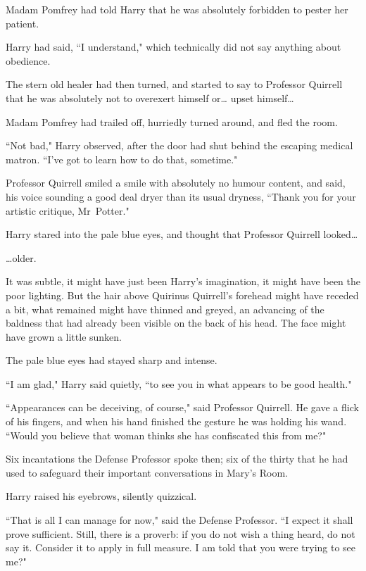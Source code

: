 Madam Pomfrey had told Harry that he was absolutely forbidden to pester her patient.

Harry had said, ``I understand," which technically did not say anything about obedience.

The stern old healer had then turned, and started to say to Professor Quirrell that he was absolutely not to overexert himself or{\ldots} upset himself{\ldots}

Madam Pomfrey had trailed off, hurriedly turned around, and fled the room.

``Not bad," Harry observed, after the door had shut behind the escaping medical matron. ``I've got to learn how to do that, sometime."

Professor Quirrell smiled a smile with absolutely no humour content, and said, his voice sounding a good deal dryer than its usual dryness, ``Thank you for your artistic critique, Mr~Potter."

Harry stared into the pale blue eyes, and thought that Professor Quirrell looked{\ldots}

{\ldots}older.

It was subtle, it might have just been Harry's imagination, it might have been the poor lighting. But the hair above Quirinus Quirrell's forehead might have receded a bit, what remained might have thinned and greyed, an advancing of the baldness that had already been visible on the back of his head. The face might have grown a little sunken.

The pale blue eyes had stayed sharp and intense.

``I am glad," Harry said quietly, ``to see you in what appears to be good health."

``Appearances can be deceiving, of course," said Professor Quirrell. He gave a flick of his fingers, and when his hand finished the gesture he was holding his wand. ``Would you believe that woman thinks she has confiscated this from me?"

Six incantations the Defense Professor spoke then; six of the thirty that he had used to safeguard their important conversations in Mary's Room.

Harry raised his eyebrows, silently quizzical.

``That is all I can manage for now," said the Defense Professor. ``I expect it shall prove sufficient. Still, there is a proverb: if you do not wish a thing heard, do not say it. Consider it to apply in full measure. I am told that you were trying to see me?"

